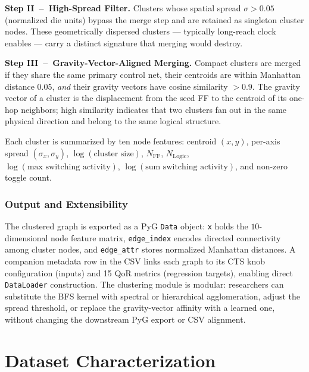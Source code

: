 \documentclass[acmsmall,review,anonymous]{acmart}
\begin{document}
\medskip\noindent\textbf{Step II~--~High-Spread Filter.}
Clusters whose spatial spread $\sigma > 0.05$ (normalized die units)
bypass the merge step and are retained as singleton cluster nodes.
These geometrically dispersed clusters --- typically long-reach clock enables
--- carry a distinct signature that merging would destroy.

\medskip\noindent\textbf{Step III~--~Gravity-Vector-Aligned Merging.}
Compact clusters are merged if they share the same primary control net,
their centroids are within Manhattan distance $0.05$, \emph{and} their
gravity vectors have cosine similarity $> 0.9$.  The gravity vector of a
cluster is the displacement from the seed FF to the centroid of its
one-hop neighbors; high similarity indicates that two clusters fan out in
the same physical direction and belong to the same logical structure.

\medskip
Each cluster is summarized by ten node features: centroid $(x,y)$,
per-axis spread $(\sigma_x,\sigma_y)$, $\log(\text{cluster size})$,
$N_\text{FF}$, $N_\text{Logic}$, $\log(\text{max switching activity})$,
$\log(\text{sum switching activity})$, and non-zero toggle count.

\subsubsection*{Output and Extensibility}

The clustered graph is exported as a PyG \texttt{Data} object:
\texttt{x} holds the $10$-dimensional node feature matrix,
\texttt{edge\_index} encodes directed connectivity among cluster nodes,
and \texttt{edge\_attr} stores normalized Manhattan distances.
A companion metadata row in the CSV links each graph to its CTS knob
configuration (inputs) and 15 QoR metrics (regression targets), enabling
direct \texttt{DataLoader} construction.  The clustering module is modular:
researchers can substitute the BFS kernel with spectral or hierarchical
agglomeration, adjust the spread threshold, or replace the gravity-vector
affinity with a learned one, without changing the downstream PyG export or
CSV alignment.

\section{Dataset Characterization}
\label{sec:analysis}
\end{document}
